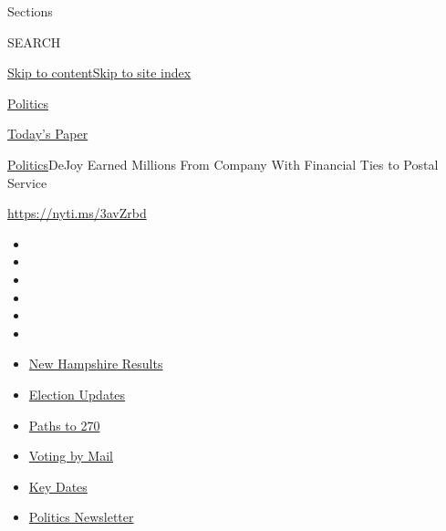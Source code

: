 Sections

SEARCH

\protect\hyperlink{site-content}{Skip to
content}\protect\hyperlink{site-index}{Skip to site index}

\href{https://www.nytimes3xbfgragh.onion/section/politics}{Politics}

\href{https://myaccount.nytimes3xbfgragh.onion/auth/login?response_type=cookie\&client_id=vi}{}

\href{https://www.nytimes3xbfgragh.onion/section/todayspaper}{Today's
Paper}

\href{/section/politics}{Politics}\textbar{}DeJoy Earned Millions From
Company With Financial Ties to Postal Service

\url{https://nyti.ms/3avZrbd}

\begin{itemize}
\item
\item
\item
\item
\item
\item
\end{itemize}

\begin{itemize}
\item
  \href{https://www.nytimes3xbfgragh.onion/interactive/2020/09/08/us/elections/results-new-hampshire-primary-elections.html?action=click\&pgtype=Article\&state=default\&region=TOP_BANNER\&context=storylines_menu}{New
  Hampshire Results}
\item
  \href{https://www.nytimes3xbfgragh.onion/live/2020/09/08/us/trump-vs-biden?action=click\&pgtype=Article\&state=default\&region=TOP_BANNER\&context=storylines_menu}{Election
  Updates}
\item
  \href{https://www.nytimes3xbfgragh.onion/interactive/2020/us/elections/election-states-biden-trump.html?action=click\&pgtype=Article\&state=default\&region=TOP_BANNER\&context=storylines_menu}{Paths
  to 270}
\item
  \href{https://www.nytimes3xbfgragh.onion/interactive/2020/08/31/us/politics/vote-by-mail-deadlines.html?action=click\&pgtype=Article\&state=default\&region=TOP_BANNER\&context=storylines_menu}{Voting
  by Mail}
\item
  \href{https://www.nytimes3xbfgragh.onion/interactive/2019/us/elections/2020-presidential-election-calendar.html?action=click\&pgtype=Article\&state=default\&region=TOP_BANNER\&context=storylines_menu}{Key
  Dates}
\item
  \href{https://www.nytimes3xbfgragh.onion/newsletters/politics?action=click\&pgtype=Article\&state=default\&region=TOP_BANNER\&context=storylines_menu}{Politics
  Newsletter}
\end{itemize}

